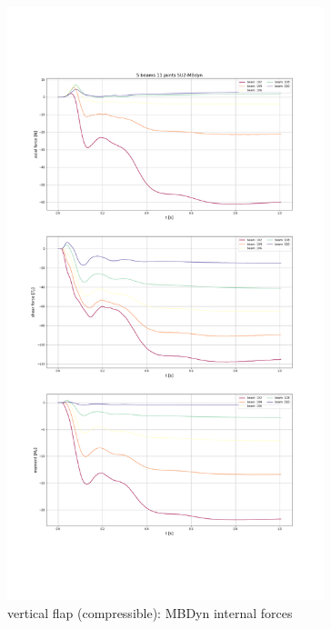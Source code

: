 \begin{figure}[htbp!]
	\centering
	\includegraphics[width=0.82\textwidth]{images/comp_flap/vert-flap_SU2-MBDyn_act.png}
	\caption{vertical flap (compressible): MBDyn internal forces}
	\label{fig:comp_mbd_internal}
\end{figure}


\newpage














































